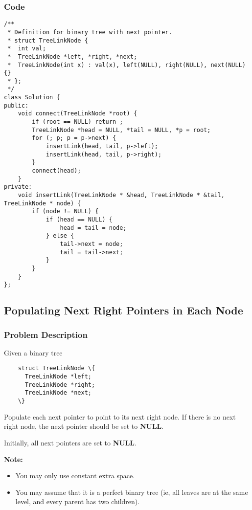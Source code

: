 \documentclass{article}
\begin{document}
\begin{CJK*}{UTF8}{gkai}
\subsubsection*{Code}
\begin{lstlisting}
/**
 * Definition for binary tree with next pointer.
 * struct TreeLinkNode {
 *  int val;
 *  TreeLinkNode *left, *right, *next;
 *  TreeLinkNode(int x) : val(x), left(NULL), right(NULL), next(NULL) {}
 * };
 */
class Solution {
public:
    void connect(TreeLinkNode *root) {
        if (root == NULL) return ;
        TreeLinkNode *head = NULL, *tail = NULL, *p = root;
        for (; p; p = p->next) {
            insertLink(head, tail, p->left);
            insertLink(head, tail, p->right);
        }
        connect(head);
    }
private:
    void insertLink(TreeLinkNode * &head, TreeLinkNode * &tail, TreeLinkNode * node) {
        if (node != NULL) {
            if (head == NULL) {
                head = tail = node;
            } else {
                tail->next = node;
                tail = tail->next;
            }
        }
    }
};

\end{lstlisting}


\subsection{ Populating Next Right Pointers in Each Node }
\label{ Populating Next Right Pointers in Each Node }

\subsubsection*{Problem Description}
Given a binary tree
\begin{verbatim}
    struct TreeLinkNode \{
      TreeLinkNode *left;
      TreeLinkNode *right;
      TreeLinkNode *next;
    \}
\end{verbatim}

Populate each next pointer to point to its next right node. If there is no next right node, the next pointer should be set to \textbf{NULL}.

Initially, all next pointers are set to \textbf{NULL}.

\textbf{Note:}

\begin{itemize}
\item You may only use constant extra space.
\item You may assume that it is a perfect binary tree (ie, all leaves are at the same level, and every parent has two children).
\end{itemize}


\end{CJK*}
\end{document}

